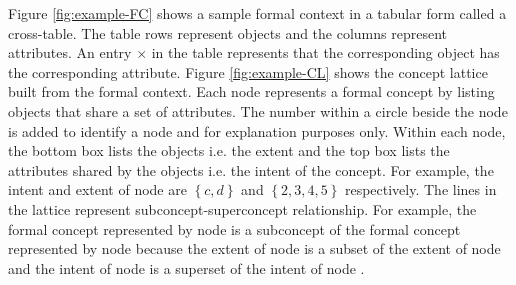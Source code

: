 Figure \ref{fig:example-FC} shows a sample formal context in a tabular form called a cross-table. The table rows represent objects and the columns represent attributes. An entry $\times$ in the table represents that the corresponding object has the corresponding attribute. Figure \ref{fig:example-CL} shows the concept lattice built from the formal context. Each node represents a formal concept by listing objects that share a set of attributes. The number within a circle beside the node is added to identify a node and for explanation purposes only. Within each node, the bottom box lists the objects i.e. the extent and the top box lists the attributes shared by the objects i.e. the intent of the concept. For example, the intent and extent of node   are $\left\{ c,d \right\}$ and $\left\{ 2,3,4,5 \right\}$ respectively. The lines in the lattice represent subconcept-superconcept relationship. For example, the formal concept represented by node  is a subconcept of the formal concept represented by node  because the extent of node  is a subset of the extent of node   and the intent of node  is a superset of the intent of node . 
